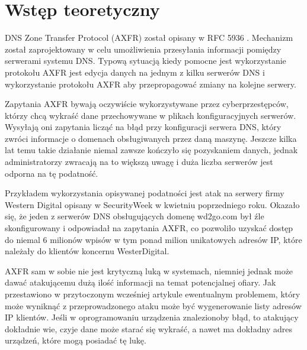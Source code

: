 \section{Wstęp teoretyczny}

DNS Zone Transfer Protocol (AXFR) został opisany w RFC 5936 \cite{RFC5936}. Mechanizm został zaprojektowany w celu umożliwienia przesyłania informacji pomiędzy serwerami systemu DNS. Typową sytuacją kiedy pomocne jest wykorzystanie protokołu AXFR jest edycja danych na jednym z kilku serwerów DNS i wykorzystanie protokołu AXFR aby przepropagować zmiany na kolejne serwery.

Zapytania AXFR bywają oczywiście wykorzystywane przez cyberprzestępców, którzy chcą wykraść dane przechowywane w plikach konfiguracyjnych serwerów. Wysyłają oni zapytania licząć na błąd przy konfiguracji serwera DNS, który zwróci informacje o domenach obsługiwanych przez daną maszynę. Jeszcze kilka lat temu takie działanie niemal zawsze kończyło się pozyskaniem danych, jednak administratorzy zwracają na to większą uwagę i duża liczba serwerów jest odporna na tę podatność.

Przykładem wykorzystania opisywanej podatności jest atak na serwery firmy Western Digital opisany w SecurityWeek \cite{wd} w kwietniu poprzedniego roku. Okazało się, że jeden z serwerów DNS obsługujących domenę wd2go.com był źle skonfigurowany i odpowiadał na zapytania AXFR, co pozwoliło uzyskać dostęp do niemal 6 milionów wpisów w tym ponad milion unikatowych adresów IP, które należały do klientów koncernu WesterDigital.

AXFR sam w sobie nie jest krytyczną luką w systemach, niemniej jednak może dawać atakującemu dużą ilość informacji na temat potencjalnej ofiary. Jak przestawiono w przytoczonym wcześniej artykule \cite{wd} ewentualnym problemem, który może wyniknąć z przeprowadzonego ataku może być wygenerowanie listy adresów IP klientów. Jeśli w oprogramowaniu urządzenia znalezionoby błąd, to atakujący dokładnie wie, czyje dane może starać się wykraść, a nawet ma dokładny adres urządzeń, które mogą posiadać tę lukę.